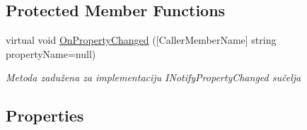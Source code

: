 \subsection*{Protected Member Functions}
\begin{DoxyCompactItemize}
\item 
virtual void \mbox{\hyperlink{class_easy_library_application_1_1_w_p_f_1_1_view_model_1_1_login_view_model_a37085a6166656c44d579c25c90f82e29}{On\+Property\+Changed}} (\mbox{[}Caller\+Member\+Name\mbox{]} string property\+Name=null)
\begin{DoxyCompactList}\small\item\em Metoda zadužena za implementaciju I\+Notify\+Property\+Changed sučelja \end{DoxyCompactList}\end{DoxyCompactItemize}
\subsection*{Properties}

